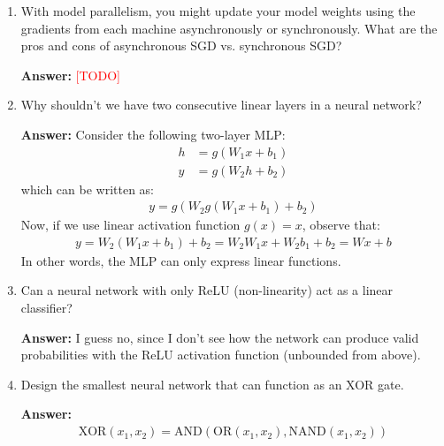 \documentclass{article}
\newenvironment{QandA}{\begin{enumerate}[label=\arabic*.]}{\end{enumerate}}
\newenvironment{answer}{\par\normalfont \textbf{Answer:}}{}
\newcommand{\todo}{\textcolor{red}{[TODO]}}
\begin{document}
\begin{QandA}
    \item With model parallelism, you might update your model weights using the gradients from each machine asynchronously or synchronously. What are the pros and cons of asynchronous SGD vs. synchronous SGD?
    \begin{answer}
        \todo 
    \end{answer}

    \item Why shouldn’t we have two consecutive linear layers in a neural network?
    \begin{answer}
        Consider the following two-layer MLP:
        \begin{align*}
            h &= g(W_1 x + b_1) \\
            y &= g(W_2 h + b_2)
        \end{align*}
        which can be written as:
        \begin{align*}
            y = g(W_2 g(W_1 x + b_1) + b_2)
        \end{align*}
        Now, if we use linear activation function $g(x) = x$, observe that:
        \begin{align*}
            y = W_2 (W_1 x + b_1) + b_2 = W_2 W_1 x + W_2 b_1 + b_2 = W x + b
        \end{align*}
        In other words, the MLP can only express linear functions. 
    \end{answer}

    \item Can a neural network with only ReLU (non-linearity) act as a linear classifier?
    \begin{answer}
        I guess no, since I don't see how the network can produce valid probabilities with the ReLU activation function (unbounded from above). 
    \end{answer}

    \item Design the smallest neural network that can function as an XOR gate.
    \begin{answer}
        \begin{align*}
            \text{XOR}(x_1, x_2) = \text{AND} \left( \text{OR}(x_1, x_2), \text{NAND}(x_1, x_2) \right)
        \end{align*}
    \end{answer}


\end{QandA}
\end{document}
